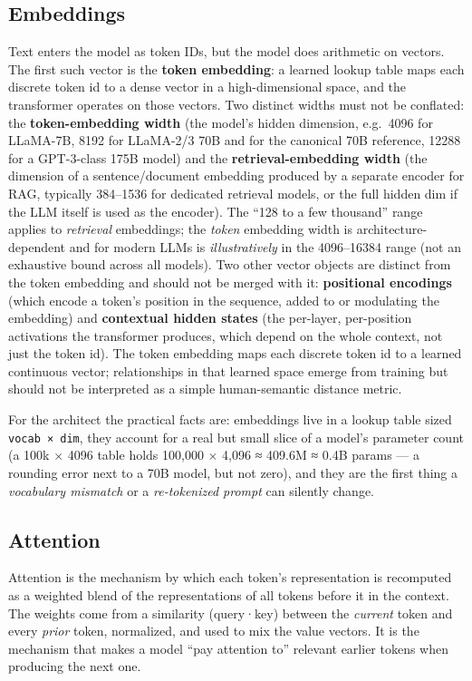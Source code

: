 \subsection{Embeddings}\label{embeddings}

Text enters the model as token IDs, but the model does arithmetic on
vectors. The first such vector is the \textbf{token embedding}: a
learned lookup table maps each discrete token id to a dense vector in a
high-dimensional space, and the transformer operates on those vectors.
Two distinct widths must not be conflated: the \textbf{token-embedding
width} (the model's hidden dimension, e.g.~4096 for LLaMA-7B, 8192 for
LLaMA-2/3 70B and for the canonical 70B reference, 12288 for a
GPT-3-class 175B model) and the \textbf{retrieval-embedding width} (the
dimension of a sentence/document embedding produced by a separate
encoder for RAG, typically 384--1536 for dedicated retrieval models, or
the full hidden dim if the LLM itself is used as the encoder). The ``128
to a few thousand'' range applies to \emph{retrieval} embeddings; the
\emph{token} embedding width is architecture-dependent and for modern
LLMs is \emph{illustratively} in the 4096--16384 range (not an
exhaustive bound across all models). Two other vector objects are
distinct from the token embedding and should not be merged with it:
\textbf{positional encodings} (which encode a token's position in the
sequence, added to or modulating the embedding) and \textbf{contextual
hidden states} (the per-layer, per-position activations the transformer
produces, which depend on the whole context, not just the token id). The
token embedding maps each discrete token id to a learned continuous
vector; relationships in that learned space emerge from training but
should not be interpreted as a simple human-semantic distance metric.

For the architect the practical facts are: embeddings live in a lookup
table sized \texttt{vocab\ ×\ dim}, they account for a real but small
slice of a model's parameter count (a 100k × 4096 table holds 100,000 ×
4,096 ≈ 409.6M ≈ 0.4B params --- a rounding error next to a 70B model,
but not zero), and they are the first thing a \emph{vocabulary mismatch}
or a \emph{re-tokenized prompt} can silently change.

\subsection{Attention}\label{attention}

Attention is the mechanism by which each token's representation is
recomputed as a weighted blend of the representations of all tokens
before it in the context. The weights come from a similarity (query·key)
between the \emph{current} token and every \emph{prior} token,
normalized, and used to mix the value vectors. It is the mechanism that
makes a model ``pay attention to'' relevant earlier tokens when
producing the next one.

